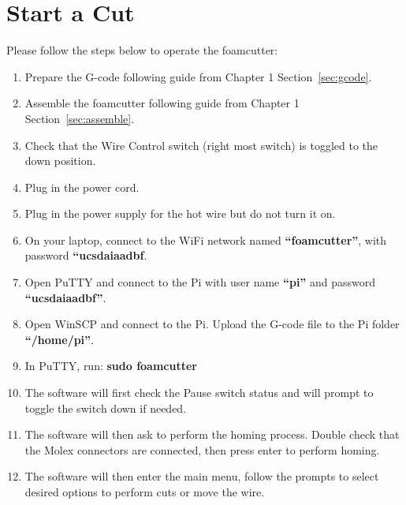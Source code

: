 \documentclass[titlepage,12pt,letter]{report}
\numberwithin{equation}{chapter}
\begin{document}
\section{Start a Cut}
Please follow the steps below to operate the foamcutter:
\begin{enumerate}[noitemsep,topsep=0pt]
	\item Prepare the G-code following guide from Chapter 1 Section~\ref{sec:gcode}.
	\item Assemble the foamcutter following guide from Chapter 1 Section~\ref{sec:assemble}.
	\item Check that the Wire Control switch (right most switch) is toggled to the down position.
	\item Plug in the power cord.
	\item Plug in the power supply for the hot wire but do not turn it on.
	\item On your laptop, connect to the WiFi network named \textbf{``foamcutter''}, with password \textbf{``ucsdaiaadbf}.
	\item Open PuTTY and connect to the Pi with user name \textbf{``pi''} and password \\ \textbf{``ucsdaiaadbf''}.
	\item Open WinSCP and connect to the Pi. Upload the G-code file to the Pi folder \\ \textbf{``/home/pi''}.
	\item In PuTTY, run: \textbf{sudo foamcutter}
	\item The software will first check the Pause switch status and will prompt to toggle the switch down if needed.
	\item The software will then ask to perform the homing process. Double check that the Molex connectors are connected, then press enter to perform homing. 
	\item The software will then enter the main menu, follow the prompts to select desired options to perform cuts or move the wire.
\end{enumerate}
\end{document}
